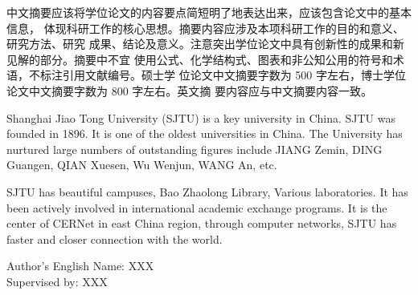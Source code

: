 
\reAbstract

中文摘要应该将学位论文的内容要点简短明了地表达出来，应该包含论文中的基本信息，
体现科研工作的核心思想。摘要内容应涉及本项科研工作的目的和意义、研究方法、研究
成果、结论及意义。注意突出学位论文中具有创新性的成果和新见解的部分。摘要中不宜
使用公式、化学结构式、图表和非公知公用的符号和术语，不标注引用文献编号。硕士学
位论文中文摘要字数为 500 字左右，博士学位论文中文摘要字数为 800 字左右。英文摘
要内容应与中文摘要内容一致。


\reAbstractEN

Shanghai Jiao Tong University (SJTU) is a key university in China. SJTU was
founded in 1896. It is one of the oldest universities in China. The University
has nurtured large numbers of outstanding figures include JIANG Zemin, DING
Guangen, QIAN Xuesen, Wu Wenjun, WANG An, etc.

SJTU has beautiful campuses, Bao Zhaolong Library, Various laboratories. It
has been actively involved in international academic exchange programs. It is
the center of CERNet in east China region, through computer networks, SJTU has
faster and closer connection with the world.

\ifreview
\else
\begin{flushright}
    Author's English Name: XXX\\Supervised by: XXX
\end{flushright}
\fi

